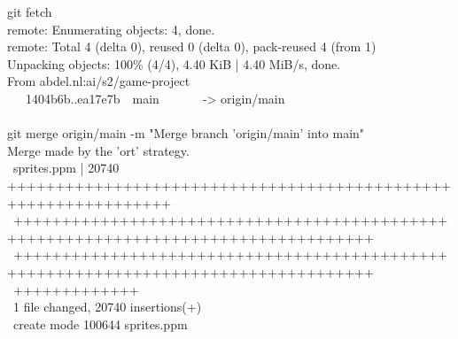 \begin{bash}
 git fetch\\
remote: Enumerating objects: 4, done. \\
remote: Total 4 (delta 0), reused 0 (delta 0), pack-reused 4 (from 1) \\
Unpacking objects: 100\% (4/4), 4.40 KiB | 4.40 MiB/s, done. \\
From abdel.nl:ai/s2/game-project \\
\ \ \ 1404b6b..ea17e7b\ \ main\ \ \ \ \ \ \ -> origin/main \\
~ \\
 git merge origin/main -m "Merge branch 'origin/main' into main" \\
Merge made by the 'ort' strategy. \\
\ sprites.ppm | 20740 {\color{ttgreen}+++++++++++++++++++++++++++++++++++++++++++++++++++++++++++++++\\
\ +++++++++++++++++++++++++++++++++++++++++++++++++++++++++++++++++++++++++++++++++++\\
\ +++++++++++++++++++++++++++++++++++++++++++++++++++++++++++++++++++++++++++++++++++\\
\ +++++++++++++} \\
\ 1 file changed, 20740 insertions(+) \\
\ create mode 100644 sprites.ppm \\
\end{bash}

